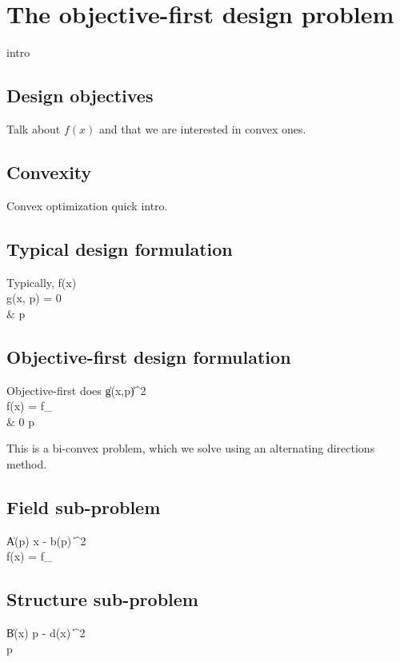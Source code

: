 
\section{The objective-first design problem}
intro

\subsection{Design objectives}
Talk about $f(x)$ and that we are interested in convex ones.

\subsection{Convexity}
Convex optimization quick intro.

\subsection{Typical design formulation}
Typically,
\BA {} f(x) \\
    \subto g(x, p) = 0 \\
        & p  \EA

\subsection{Objective-first design formulation}
Objective-first does 
\BA {} \|g(x,p)\|^2 \\
    \subto f(x) = f_ \\
        & 0 \le p  \EA

This is a bi-convex problem, which we solve using an alternating directions method.

\subsection{Field sub-problem}
\BA {} \| A(p) x - b(p) \|^2 \\
    \subto f(x) = f_ \EA

\subsection{Structure sub-problem}
\BA {} \| B(x) p - d(x) \|^2 \\
     \le p  \EA


